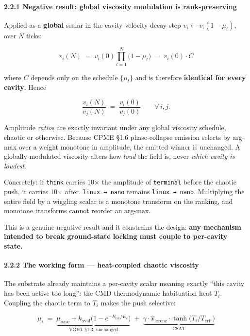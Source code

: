 \documentclass[
  11pt,
  a4paper,
]{article}
\begin{document}
\paragraph{2.2.1 Negative result: global viscosity modulation is
rank-preserving}\label{negative-result-global-viscosity-modulation-is-rank-preserving}

Applied as a \textbf{global} scalar in the cavity velocity-decay step
\(v_i \leftarrow v_i(1 - \mu_t)\), over \(N\) ticks:

\[ v_i(N) \;=\; v_i(0) \prod_{t=1}^{N}\bigl(1 - \mu_t\bigr) \;=\; v_i(0)\cdot C \]

where \(C\) depends only on the schedule \(\{\mu_t\}\) and is therefore
\textbf{identical for every cavity}. Hence

\[ \frac{v_i(N)}{v_j(N)} \;=\; \frac{v_i(0)}{v_j(0)} \qquad \forall\, i,j. \]

Amplitude \emph{ratios} are exactly invariant under any global viscosity
schedule, chaotic or otherwise. Because CPME §1.6 phase-collapse
emission selects by arg-max over a weight monotone in amplitude, the
emitted winner is unchanged. A globally-modulated viscosity alters how
\emph{loud} the field is, never \emph{which cavity is loudest}.

Concretely: if \texttt{think} carries 10× the amplitude of
\texttt{terminal} before the chaotic push, it carries 10× after.
\texttt{linux\ →\ nano} remains \texttt{linux\ →\ nano}. Multiplying the
entire field by a wiggling scalar is a monotone transform on the
ranking, and monotone transforms cannot reorder an arg-max.

This is a genuine negative result and it constrains the design:
\textbf{any mechanism intended to break ground-state locking must couple
to per-cavity state.}

\paragraph{2.2.2 The working form --- heat-coupled chaotic
viscosity}\label{the-working-form-heat-coupled-chaotic-viscosity}

The substrate already maintains a per-cavity scalar meaning exactly
``this cavity has been active too long'': the CMD thermodynamic
habituation heat \(T_i\). Coupling the chaotic term to \(T_i\) makes the
push selective:

\[ \mu_i \;=\; \underbrace{\mu_{\text{base}} + k_{\text{aval}}\bigl(1 - e^{-E_{\text{tot}}/E_s}\bigr)}_{\text{VGHT §1.3, unchanged}} \;+\; \underbrace{\gamma \cdot \hat{x}_{\text{lorenz}} \cdot \tanh\!\bigl(T_i / T_{\text{crit}}\bigr)}_{\text{CSAT}} \]
\end{document}
